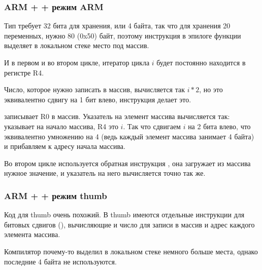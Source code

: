 ﻿\subsubsection{ARM + \NonOptimizingKeil + режим ARM}



Тип \Tint требует 32 бита для хранения, или 4 байта, так что для хранения 20 переменных, нужно 80 (0x50) байт,
поэтому инструкция  в эпилоге функции выделяет в локальном стеке место под массив.

И в первом и во втором цикле, итератор цикла $i$ будет постоянно находится в регистре R4.

Число, которое нужно записать в массив, вычисляется так $i*2$, но это эквивалентно сдвигу на 1 бит влево, 
инструкция  делает это.

 записывает R0 в массив. Указатель на элемент массива вычисляется так: \SP указывает
на начало массива, R4 это $i$. Так что сдвигаем $i$ на 2 бита влево, что эквивалентно умножению на 4 (ведь каждый
элемент массива занимает 4 байта) и прибавляем к адресу начала массива.

Во втором цикле используется обратная инструкция , она загружает из массива нужное
значение, и указатель на него вычисляется точно так же.

\subsubsection{ARM + \OptimizingKeil + режим thumb}



Код для thumb очень похожий. В thumb имеются отдельные инструкции для битовых сдвигов (), вычисляющие и
число для записи в массив и адрес каждого элемента массива.

Компилятор почему-то выделил в локальном стеке немного больше места, однако последние 4 байта не используются.

